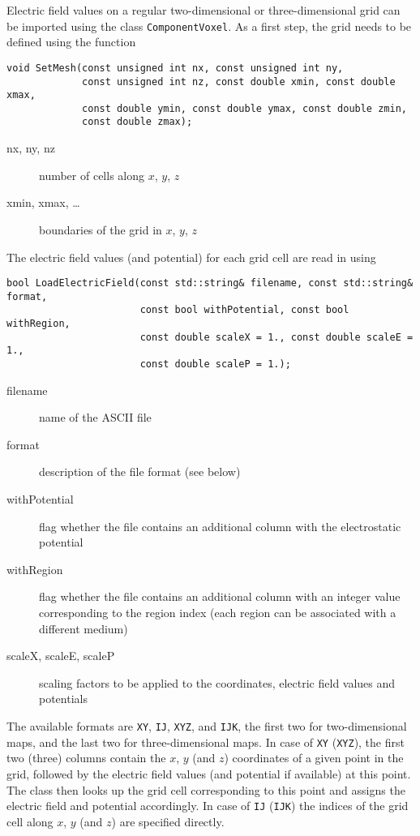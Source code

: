 Electric field values on a regular two-dimensional or three-dimensional grid 
can be imported using the class \texttt{ComponentVoxel}. 
As a first step, the grid needs to be defined using the function
\begin{lstlisting}
void SetMesh(const unsigned int nx, const unsigned int ny,
             const unsigned int nz, const double xmin, const double xmax,
             const double ymin, const double ymax, const double zmin,
             const double zmax);
\end{lstlisting}
\begin{description}
  \item[nx, ny, nz] 
  number of cells along $x$, $y$, $z$
  \item[xmin, xmax, \dots] 
  boundaries of the grid in $x$, $y$, $z$
\end{description}
The electric field values (and potential) for each grid cell are read in 
using
\begin{lstlisting}
bool LoadElectricField(const std::string& filename, const std::string& format,
                       const bool withPotential, const bool withRegion,
                       const double scaleX = 1., const double scaleE = 1.,
                       const double scaleP = 1.);
\end{lstlisting}
\begin{description}
  \item[filename]
  name of the ASCII file
  \item[format]
  description of the file format (see below)
  \item[withPotential]
  flag whether the file contains an additional column with the electrostatic potential
  \item[withRegion]
  flag whether the file contains an additional column with an integer value 
  corresponding to the region index (each region can be associated with a different medium)
  \item[scaleX, scaleE, scaleP]
  scaling factors to be applied to the coordinates, electric field values 
  and potentials 
\end{description}
The available formats are \texttt{XY}, \texttt{IJ}, \texttt{XYZ}, 
and \texttt{IJK}, the first two for two-dimensional maps, and the 
last two for three-dimensional maps.
In case of \texttt{XY} (\texttt{XYZ}), the first two (three) columns  
contain the $x$, $y$ (and $z$) coordinates of a given point in the 
grid, followed by the electric field values (and potential if available) at 
this point. The class then looks up the grid cell corresponding to this 
point and assigns the electric field and potential accordingly.
In case of \texttt{IJ} (\texttt{IJK}) the indices of the grid cell 
along $x$, $y$ (and $z$) are specified directly.

